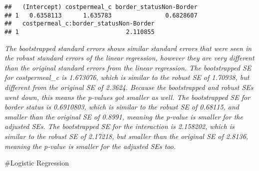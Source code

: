 \documentclass[]{article}
\newenvironment{Shaded}{\begin{snugshade}}{\end{snugshade}}
\newcommand{\CommentTok}[1]{\textcolor[rgb]{0.56,0.35,0.01}{\textit{#1}}}
\newcommand{\DataTypeTok}[1]{\textcolor[rgb]{0.13,0.29,0.53}{#1}}
\newcommand{\DecValTok}[1]{\textcolor[rgb]{0.00,0.00,0.81}{#1}}
\newcommand{\KeywordTok}[1]{\textcolor[rgb]{0.13,0.29,0.53}{\textbf{#1}}}
\newcommand{\NormalTok}[1]{#1}
\newcommand{\OperatorTok}[1]{\textcolor[rgb]{0.81,0.36,0.00}{\textbf{#1}}}
\newcommand{\StringTok}[1]{\textcolor[rgb]{0.31,0.60,0.02}{#1}}
\begin{document}
\begin{Shaded}
\end{Shaded}

\begin{verbatim}
##   (Intercept) costpermeal_c border_statusNon-Border
## 1   0.6358113      1.635783               0.6828607
##   costpermeal_c:border_statusNon-Border
## 1                              2.110855
\end{verbatim}

\emph{The bootstrapped standard errors shows similar standard errors
that were seen in the robust standard errors of the linear regression,
however they are very different than the original standard errors from
the linear regression. The bootstrapped SE for costpermeal\_c is
1.673076, which is similar to the robust SE of 1.70938, but different
from the original SE of 2.3624. Because the bootstrapped and robust SEs
went down, this means the p-values got smaller as well. The bootstrapped
SE for border status is 0.6910803, which is similar to the robust SE of
0.68115, and smaller than the original SE of 0.8991, meaning the p-value
is smaller for the adjusted SEs. The bootstrapped SE for the interaction
is 2.158202, which is similar to the robust SE of 2.17218, but smaller
than the original SE of 2.8136, meaning the p-value is smaller for the
adjusted SEs too.}

\#Logistic Regression

\begin{Shaded}
\end{Shaded}
\end{document}
